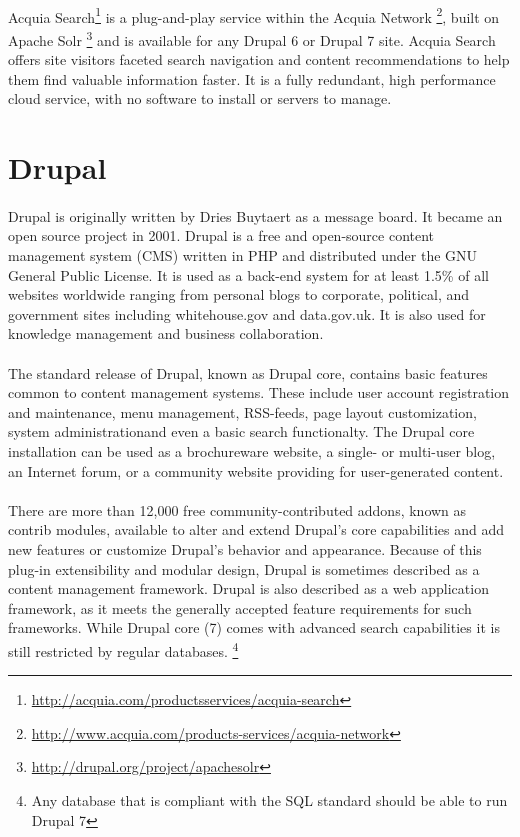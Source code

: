 {\paragraph{}
Acquia Search\footnote{\url{http://acquia.com/productsservices/acquia-search}} is a plug-and-play service within the Acquia Network \footnote{\url{http://www.acquia.com/products-services/acquia-network}}, built on Apache Solr \footnote{\url{http://drupal.org/project/apachesolr}} and is available for any Drupal 6 or Drupal 7 site. Acquia Search offers site visitors faceted search navigation and content recommendations to help them find valuable information faster. It is a fully redundant, high performance cloud service, with no software to install or servers to manage.

\section{Drupal}
\paragraph{}
Drupal is originally written by Dries Buytaert as a message board. It became an open source project in 2001. Drupal is a free and open-source content management system (CMS) written in PHP and distributed under the GNU General Public License. It is used as a back-end system for at least 1.5\% of all websites worldwide ranging from personal blogs to corporate, political, and government sites including whitehouse.gov and data.gov.uk. It is also used for knowledge management and business collaboration.

\paragraph{}
The standard release of Drupal, known as Drupal core, contains basic features common to content management systems. These include user account registration and maintenance, menu management, RSS-feeds, page layout customization, system administrationand even a basic search functionalty. The Drupal core installation can be used as a brochureware website, a single- or multi-user blog, an Internet forum, or a community website providing for user-generated content.

\paragraph{}
There are more than 12,000 free community-contributed addons, known as contrib modules, available to alter and extend Drupal's core capabilities and add new features or customize Drupal's behavior and appearance. Because of this plug-in extensibility and modular design, Drupal is sometimes described as a content management framework. Drupal is also described as a web application framework, as it meets the generally accepted feature requirements for such frameworks.
While Drupal core (7) comes with advanced search capabilities it is still restricted by regular databases. \footnote{Any database that is compliant with the SQL standard should be able to run Drupal 7}

}
